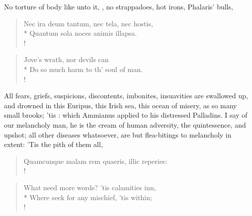 No torture of body like unto it, , no strappadoes, hot irons, Phalaris' bulls,

\begin{latin}
\begin{verse}%
Nec ira deum tantum, nec tela, nec hostis,\\*
Quantum sola noces animis illapsa.\\!
\end{verse}%
\end{latin}
\translationrule%
\begin{verse}%
Jove's wrath, nor devils can\\*
Do so much harm to th' soul of man.\\!
\end{verse}%
%

All fears, griefs, suspicions, discontents, imbonites, insuavities are swallowed up, and drowned in this Euripus, this Irish sea, this ocean of misery, as so many small brooks; 'tis : which Ammianus applied to his distressed Palladins. I say of our melancholy man, he is the cream of human adversity, the quintessence, and upshot; all other diseases whatsoever, are but flea-bitings to melancholy in extent: 'Tis the pith of them all,

\begin{latin}
\begin{verse}%
Quamcunque malam rem quaeris, illic reperies:\\!
\end{verse}%
\end{latin}
\translationrule%
\begin{verse}%
What need more words? 'tis calamities inn,\\*
Where seek for any mischief, 'tis within;\\!
\end{verse}%
%

